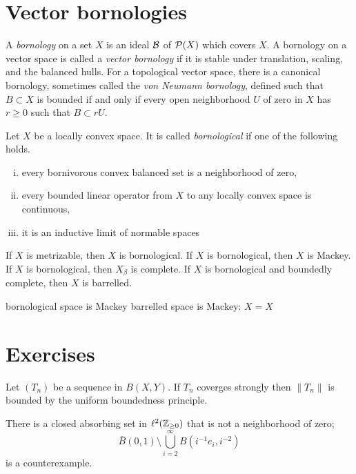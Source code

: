 \documentclass{../../large}
\begin{document}
\section{Vector bornologies}

\begin{prb}
A \emph{bornology} on a set $X$ is an ideal $\mathcal{B}$ of $\mathcal{P}(X)$ which covers $X$.
A bornology on a vector space is called a \emph{vector bornology} if it is stable under translation, scaling, and the balanced hulls.
For a topological vector space, there is a canonical bornology, sometimes called the \emph{von Neumann bornology}, defined such that $B\subset X$ is bounded if and only if every open neighborhood $U$ of zero in $X$ has $r\ge0$ such that $B\subset rU$.

Let $X$ be a locally convex space.
It is called \emph{bornological} if one of the following holds.
\begin{enumerate}[(i)]
\item every bornivorous convex balanced set is a neighborhood of zero,
\item every bounded linear operator from $X$ to any locally convex space is continuous,
\item it is an inductive limit of normable spaces
\end{enumerate}

If $X$ is metrizable, then $X$ is bornological.
If $X$ is bornological, then $X$ is Mackey.
If $X$ is bornological, then $X_\beta$ is complete.
If $X$ is bornological and boundedly complete, then $X$ is barrelled.

\end{prb}


bornological space is Mackey
barrelled space is Mackey: $X=X$



\section*{Exercises}

\begin{prb}
Let $(T_n)$ be a sequence in $B(X,Y)$.
If $T_n$ coverges strongly then $\|T_n\|$ is bounded by the uniform boundedness principle.
\end{prb}

\begin{prb}
There is a closed absorbing set in $\ell^2(\mathbb{Z}_{\ge0})$ that is not a neighborhood of zero;
\[\bar B(0,1)\setminus\bigcup_{i=2}^\infty B(i^{-1}e_i,i^{-2})\]
is a counterexample.
\end{prb}
\end{document}
